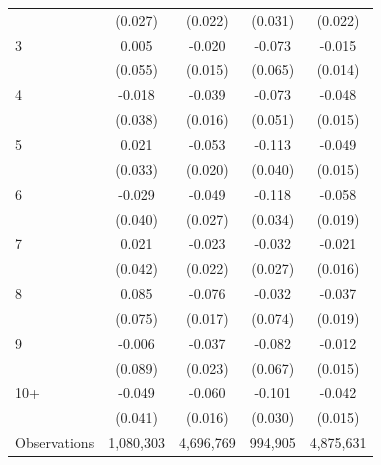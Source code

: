 \begin{table}[htbp]
\begin{tabular}{l*{4}{c}}
            &     (0.027)         &     (0.022)         &     (0.031)         &     (0.022)         \\
[1em]
3           &       0.005         &      -0.020         &      -0.073         &      -0.015         \\
            &     (0.055)         &     (0.015)         &     (0.065)         &     (0.014)         \\
[1em]
4           &      -0.018         &      -0.039\sym{**} &      -0.073         &      -0.048\sym{***}\\
            &     (0.038)         &     (0.016)         &     (0.051)         &     (0.015)         \\
[1em]
5           &       0.021         &      -0.053\sym{***}&      -0.113\sym{***}&      -0.049\sym{***}\\
            &     (0.033)         &     (0.020)         &     (0.040)         &     (0.015)         \\
[1em]
6           &      -0.029         &      -0.049\sym{*}  &      -0.118\sym{***}&      -0.058\sym{***}\\
            &     (0.040)         &     (0.027)         &     (0.034)         &     (0.019)         \\
[1em]
7           &       0.021         &      -0.023         &      -0.032         &      -0.021         \\
            &     (0.042)         &     (0.022)         &     (0.027)         &     (0.016)         \\
[1em]
8           &       0.085         &      -0.076\sym{***}&      -0.032         &      -0.037\sym{*}  \\
            &     (0.075)         &     (0.017)         &     (0.074)         &     (0.019)         \\
[1em]
9           &      -0.006         &      -0.037\sym{*}  &      -0.082         &      -0.012         \\
            &     (0.089)         &     (0.023)         &     (0.067)         &     (0.015)         \\
[1em]
10+         &      -0.049         &      -0.060\sym{***}&      -0.101\sym{***}&      -0.042\sym{***}\\
            &     (0.041)         &     (0.016)         &     (0.030)         &     (0.015)         \\
\hline
Observations&   1,080,303         &   4,696,769         &     994,905         &   4,875,631         \\

\end{tabular}
\end{table}
